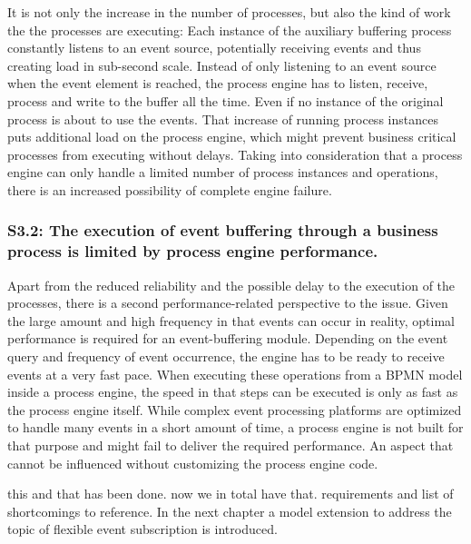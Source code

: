 It is not only the increase in the number of processes, but also the kind of work the the processes are executing: Each instance of the auxiliary buffering process constantly listens to an event source, potentially receiving events and thus creating load in sub-second scale.
Instead of only listening to an event source when the event element is reached, the process engine has to listen, receive, process and write to the buffer all the time. Even if no instance of the original process is about to use the events.
That increase of running process instances puts additional load on the process engine, which might prevent business critical processes from executing without delays. 
Taking into consideration that a process engine can only handle a limited number of process instances and operations, there is an increased possibility of complete engine failure.

\subsubsection*{S3.2: The execution of event buffering through a business process is limited by process engine performance.}
	
Apart from the reduced reliability and the possible delay to the execution of the processes, there is a second performance-related perspective to the issue.
Given the large amount and high frequency in that events can occur in reality, optimal performance is required for an event-buffering module. 
Depending on the event query and frequency of event occurrence, the engine has to be ready to receive events at a very fast pace.
When executing these operations from a BPMN model inside a process engine, the speed in that steps can be executed is only as fast as the process engine itself. While complex event processing platforms are optimized to handle many events in a short amount of time, a process engine is not built for that purpose and might fail to deliver the required performance.
An aspect that cannot be influenced without customizing the process engine code.



\medskip \noindent
{}
this and that has been done.
now we in total have that. requirements and list of shortcomings to reference.
In the next chapter a model extension to address the topic of flexible event subscription is introduced.

